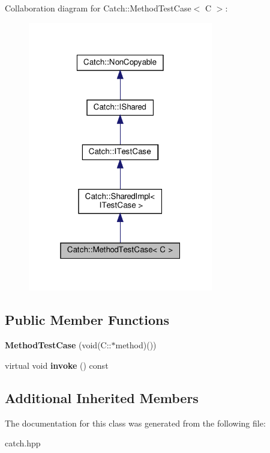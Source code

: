 Collaboration diagram for Catch\+:\+:Method\+Test\+Case$<$ C $>$\+:\nopagebreak
\begin{figure}[H]
\begin{center}
\leavevmode
\includegraphics[width=229pt]{classCatch_1_1MethodTestCase__coll__graph}
\end{center}
\end{figure}
\subsection*{Public Member Functions}
\begin{DoxyCompactItemize}
\item 
\mbox{\label{classCatch_1_1MethodTestCase_a7b043b85dae371358255dd9dc6582e7b}} 
{\bfseries Method\+Test\+Case} (void(C\+::$\ast$method)())
\item 
\mbox{\label{classCatch_1_1MethodTestCase_a4e2263cfa0646f2980768328cb372793}} 
virtual void {\bfseries invoke} () const
\end{DoxyCompactItemize}
\subsection*{Additional Inherited Members}


The documentation for this class was generated from the following file\+:\begin{DoxyCompactItemize}
\item 
catch.\+hpp\end{DoxyCompactItemize}
